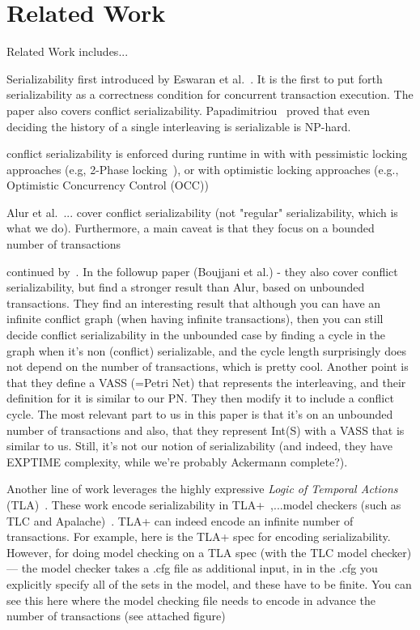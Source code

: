 \section{Related Work}
\label{sec:relatedWork}

Related Work includes...


Serializability first introduced by Eswaran et al.~\cite{EsGrKoTr76}.  It is the first to put forth serializability as a correctness condition for concurrent transaction execution.
The paper also covers conflict serializability. 
%
Papadimitriou~\cite{Pa79} proved that even deciding the history of a single interleaving is serializable is NP-hard.

conflict serializability is enforced during runtime in 
with with pessimistic locking approaches (e.g, 2-Phase locking~\cite{BeHaGo87}), or with optimistic locking approaches (e.g., Optimistic Concurrency Control (OCC))~\cite{KuRo81, BuMo06}


Alur et al.~\cite{AlMcPe96}... 
cover conflict serializability (not "regular" serializability, which is what we do). Furthermore, a main caveat is that they focus on a bounded number of transactions



continued by~\cite{BoEmEnHa13}.
In the followup paper (Boujjani et al.) - they also cover conflict serializability, but find a stronger result than Alur, based on unbounded transactions. They find an interesting result that although you can have an infinite conflict graph (when having infinite transactions), then you can still decide conflict serializability in the unbounded case by finding a cycle in the graph when it's non (conflict) serializable, and the cycle length surprisingly does not depend on the number of transactions, which is pretty cool. Another point is that they define a VASS (=Petri Net) that represents the interleaving, and their definition for it is similar to our PN. They then modify it to include a conflict cycle. The most relevant part to us in this paper is that it's on an unbounded number of transactions and also, that they represent Int(S) with a VASS that is similar to us. Still, it's not our notion of serializability (and indeed, they have EXPTIME complexity, while we're probably Ackermann complete?).



Another line of work leverages the highly expressive \textit{Logic of Temporal Actions} (TLA)~\cite{La94}. 
%
These work encode
serializability in TLA+~\cite{SoVaVi20, Ho24},...model checkers (such as TLC and Apalache)~\cite{YuMaLa99, KoKuTr19}.
%
TLA+ can indeed encode an infinite number of transactions. For example, here is the TLA+ spec for encoding serializability.
However, for doing model checking on a TLA spec (with the TLC model checker) --- the model checker takes a .cfg file as additional input, in in the .cfg you explicitly specify all of the sets in the model, and these have to be finite. You can see this here where the model checking file needs to encode in advance the number of transactions (see attached figure)




